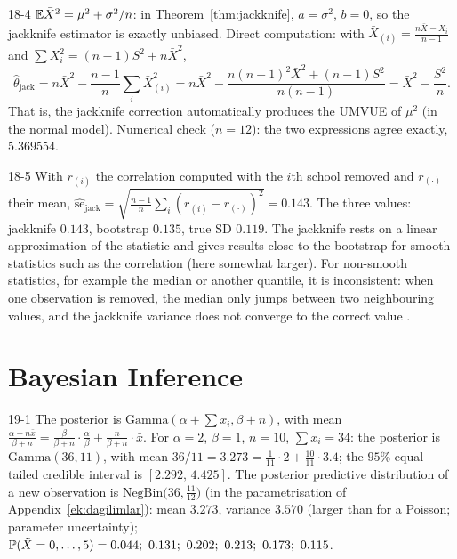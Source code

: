 \begin{solution}{18-4}
$\mathbb{E}\bar X^2=\mu^2+\sigma^2/n$: in Theorem~\ref{thm:jackknife}, $a=\sigma^2$, $b=0$, so the jackknife estimator is exactly unbiased. Direct computation: with $\bar X_{(i)}=\frac{n\bar X-X_i}{n-1}$ and $\sum X_i^2=(n-1)S^2+n\bar X^2$,
\[
\hat\theta_{\text{jack}}=n\bar X^2-\frac{n-1}{n}\sum_i\bar X_{(i)}^2=n\bar X^2-\frac{n(n-1)^2\bar X^2+(n-1)S^2}{n(n-1)}=\bar X^2-\frac{S^2}{n}.
\]
That is, the jackknife correction automatically produces the UMVUE of $\mu^2$ (in the normal model). Numerical check ($n=12$): the two expressions agree exactly, $5.369554$.
\end{solution}

\begin{solution}{18-5}
With $r_{(i)}$ the correlation computed with the $i$th school removed and $r_{(\cdot)}$ their mean, $\widehat{\mathrm{se}}_{\text{jack}}=\sqrt{\frac{n-1}{n}\sum_i(r_{(i)}-r_{(\cdot)})^2}=0.143$. The three values: jackknife $0.143$, bootstrap $0.135$, true SD $0.119$. The jackknife rests on a linear approximation of the statistic and gives results close to the bootstrap for smooth statistics such as the correlation (here somewhat larger). For non-smooth statistics, for example the median or another quantile, it is inconsistent: when one observation is removed, the median only jumps between two neighbouring values, and the jackknife variance does not converge to the correct value \cite{efron-tib}.
\end{solution}

\section{Bayesian Inference}

\begin{solution}{19-1}
The posterior is $\text{Gamma}(\alpha+\sum x_i,\beta+n)$, with mean
$\frac{\alpha+n\bar x}{\beta+n}=\frac{\beta}{\beta+n}\cdot\frac\alpha\beta+\frac{n}{\beta+n}\cdot\bar x$.
For $\alpha=2$, $\beta=1$, $n=10$, $\sum x_i=34$: the posterior is $\text{Gamma}(36,11)$, with mean $36/11=3.273=\frac1{11}\cdot2+\frac{10}{11}\cdot3.4$; the $95\%$ equal-tailed credible interval is $[2.292,\,4.425]$. The posterior predictive distribution of a new observation is $\text{NegBin}\big(36,\frac{11}{12}\big)$ (in the parametrisation of Appendix~\ref{ek:dagilimlar}): mean $3.273$, variance $3.570$ (larger than for a Poisson; parameter uncertainty); $\P(\tilde X=0,\dots,5)=0.044;\ 0.131;\ 0.202;\ 0.213;\ 0.173;\ 0.115$.
\end{solution}

